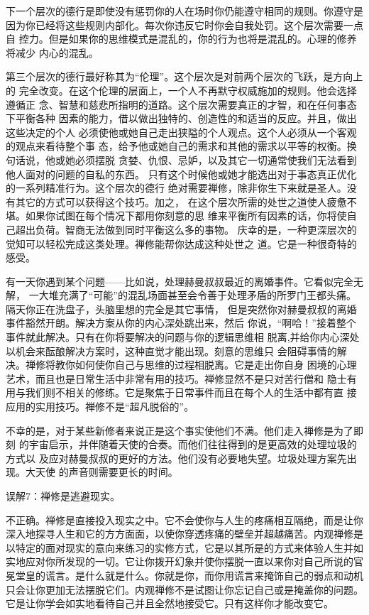下一个层次的德行是即使\1没有惩罚你的人在场时你仍能遵守相同的规则。你遵守是
因为你已经将这些规则内部化。每次你违反它时你会自我处罚。这个层次需要一点自
控力。但是如果你的思维模式是混乱的，你的行为也将是混乱的。心理的修养将减少
内心的混乱。

第三个层次的德行最好称其为“伦理”。这个层次是对前两个层次的飞跃，是方向上的
完全改变。在这个伦理的层面上，一个人不再默守权威施加的规则。他会选择遵循正
念、智慧和慈悲所指明的道路。这个层次需要真正的才智，和在任何事态下平衡各种
因素的能力，借以做出独特的、创造性的和适当的反应。并且，做出这些决定的个人
必须使他或她自己走出狭隘的个人观点。这个人必须从一个客观的观点来看待整个事
态，给予他或她自己的需求和其他的需求以平等的权衡。换句话说，他或她必须摆脱
贪婪、仇恨、忌妒，以及其它一切通常使我们无法看到他人面对的问题的自私的东西。
只有这个时候他或她才能选出对于事态真正优化的一系列精准行为。这个层次的德行
绝对需要禅修，除非你生下来就是圣人。没有其它的方式可以获得这个技巧。加之，
在这个层次所需的处世之道使人疲惫不堪。如果你试图在每个情况下都用你刻意的思
维来平衡所有因素的话，你将使自己超出负荷。智商无法做到同时平衡这么多的事物。
庆幸的是，一种更深层次的觉知可以轻松完成这类处理。禅修能帮你达成这种处世之
道。它是一种很奇特的感受。

有一天你遇到某个问题——比如说，处理赫曼叔叔最近的离婚事件。它看似完全无解，
一大堆充满了“可能”的混乱场面\1甚至会令善于处理矛盾的所罗门王都头痛。隔天你正在洗盘子，头脑里想的完全是其它事情，
但是突然你对赫曼叔叔的离婚事件豁然开朗。解决方案从你的内心深处跳出来，然后
你说，“啊哈！”接着整个事件就此解决。只有在你将要解决的问题与你的逻辑思维相
脱离,并给你内心深处以机会来酝酿解决方案时，这种直觉才能出现。刻意的思维只
会阻碍事情的解决。禅修将教你如何使你自己与思维的过程相脱离。它是走出你自身
困境的心理艺术，而且也是日常生活中非常有用的技巧。禅修显然不是只对苦行僧和
隐士有用与我们则不相关的修练。它是聚焦于日常事件而且在每个人的生活中都有直
接应用的实用技巧。禅修不是“超凡脱俗的”。

不幸的是，对于某些新修者来说正是这个事实使他们不满。他们走入禅修是为了即刻
的宇宙启示，并伴随着天使的合奏。而他们往往得到的是更高效的处理垃圾的方式以
及应对赫曼叔叔的更好的方法。他们没有必要地失望。垃圾处理方案先出现。大天使
的声音则需要更长的时间。

\subsectnon 误解7：禅修是逃避现实。

不正确。禅修是直接投入现实之中。它不会使你与人生的疼痛相互隔绝，而是让你
深入地探寻人生和它的方方面面，以使你穿透疼痛的壁垒并超越痛苦。内观禅修是
以特定的面对现实的意向来练习的实修方式，它是以其所是的方式来体验人生并如
实地应对你所发现的一切。它让你拨开幻象并使你摆脱一直以来你对自己所说的官
冕堂皇的谎言。是什么就是什么。你就是你，而你用谎言来掩饰自己的\1弱点和动机
只会让你更加无法摆脱它们。内观禅修不是试图让你忘记自己或是掩盖你的问题。
它是让你学会如实地看待自己并且全然地接受它。只有这样你才能改变它。

